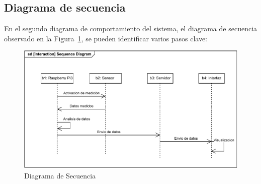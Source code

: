 \clearpage

\subsection{Diagrama de secuencia}

En el segundo diagrama de comportamiento del sistema, el diagrama de secuencia observado en la Figura~\ref{fig:diagramaSecuencia}, se pueden identificar varios pasos clave:

\begin{figure}[t]
\centering
\includegraphics[width=\textwidth]{images/diagramaSecuencia.pdf}
\caption{Diagrama de Secuencia}%
\label{fig:diagramaSecuencia}
\end{figure}




